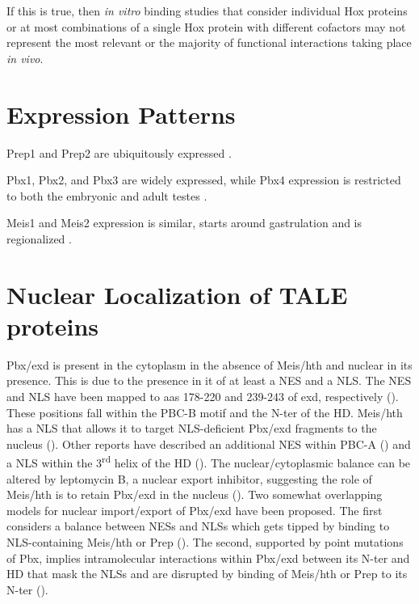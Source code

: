 If this is true, then \textit{in vitro} binding studies that consider individual Hox proteins or at most combinations of a single Hox protein with different cofactors may not represent the most relevant or the majority of functional interactions taking place \textit{in vivo}. 

\section{Expression Patterns}


Prep1 and Prep2 are ubiquitously expressed \parencite{Ferretti1999, Reymond2002, Ferretti2006}. 

Pbx1, Pbx2, and Pbx3 are widely expressed, while Pbx4 expression is restricted to both the embryonic and adult testes \parencite{Monica1991, Wagner2001}.

Meis1 and Meis2 expression is similar, starts around gastrulation and is regionalized \parencite{Cecconi1997, Oulad-Abdelghani1997, Tamplin2008}.



\section{Nuclear Localization of TALE proteins}
\label{sec:nuclearLoc}

Pbx/exd is present in the cytoplasm in the absence of Meis/hth and nuclear in its presence. This is due to the presence in it of at least a \ac{NES} and a \ac{NLS}. The \ac{NES} and \ac{NLS} have been mapped to \acp{aa} 178-220 and 239-243 of exd, respectively (\cite{Abu-Shaar1999}). These positions fall within the PBC-B motif and the \ac{N-ter} of the \ac{HD}. Meis/hth has a \ac{NLS} that allows it to target \ac{NLS}-deficient Pbx/exd fragments to the nucleus (\cite{Abu-Shaar1999}). Other reports have described an additional \ac{NES} within PBC-A (\cite{Berthelsen1999}) and a \ac{NLS} within the 3\textsuperscript{rd} helix of the \ac{HD} (\cite{Saleh2000}). The nuclear/cytoplasmic balance can be altered by leptomycin B, a nuclear export inhibitor, suggesting the role of Meis/hth is to retain Pbx/exd in the nucleus (\cite{Berthelsen1999, Abu-Shaar1999}). Two somewhat overlapping models for nuclear import/export of Pbx/exd have been proposed. The first considers a balance between \acp{NES} and \acp{NLS} which gets tipped by binding to \ac{NLS}-containing Meis/hth or Prep (\cite{Affolter1999}). The second, supported by point mutations of Pbx, implies intramolecular interactions within Pbx/exd between its \ac{N-ter} and \ac{HD} that mask the \acp{NLS} and are disrupted by binding of Meis/hth or Prep to its \ac{N-ter} (\cite{Saleh2000}).

